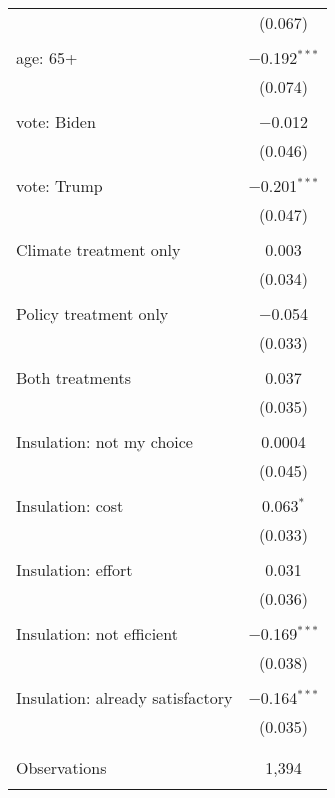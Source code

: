 \begin{tabular}{@{\extracolsep{5pt}}lc}
  & (0.067) \\ 
  & \\ 
 age: 65+ & $-$0.192$^{***}$ \\ 
  & (0.074) \\ 
  & \\ 
 vote: Biden & $-$0.012 \\ 
  & (0.046) \\ 
  & \\ 
 vote: Trump & $-$0.201$^{***}$ \\ 
  & (0.047) \\ 
  & \\ 
 Climate treatment only & 0.003 \\ 
  & (0.034) \\ 
  & \\ 
 Policy treatment only & $-$0.054 \\ 
  & (0.033) \\ 
  & \\ 
 Both treatments & 0.037 \\ 
  & (0.035) \\ 
  & \\ 
 Insulation: not my choice & 0.0004 \\ 
  & (0.045) \\ 
  & \\ 
 Insulation: cost & 0.063$^{*}$ \\ 
  & (0.033) \\ 
  & \\ 
 Insulation: effort & 0.031 \\ 
  & (0.036) \\ 
  & \\ 
 Insulation: not efficient & $-$0.169$^{***}$ \\ 
  & (0.038) \\ 
  & \\ 
 Insulation: already satisfactory & $-$0.164$^{***}$ \\ 
  & (0.035) \\ 
  & \\ 
\hline \\[-1.8ex] 

Observations & 1,394 \\ 
\hline 
\hline \\[-1.8ex] 
\end{tabular} 
